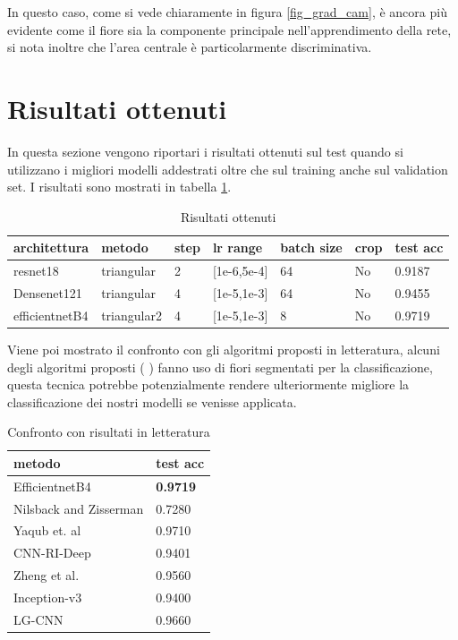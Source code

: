 In questo caso, come si vede chiaramente in figura \ref{fig_grad_cam}, è ancora più evidente come il fiore sia la componente principale nell'apprendimento della rete, si nota inoltre che l'area centrale è particolarmente discriminativa.

\section{Risultati ottenuti}
In questa sezione vengono riportari i risultati ottenuti sul test quando si utilizzano i migliori modelli addestrati oltre che sul training anche sul validation set. I risultati sono mostrati in tabella \ref{t_res}.
\begin{table}[H]
\centering
\caption{Risultati ottenuti}
\begin{tabular}{|l|l|l|l|l|l|l|}
\hline
architettura   & metodo      & step & lr range        & batch size & crop & test acc \\ \hline
resnet18       & triangular  & 2    & {[}1e-6,5e-4{]} & 64         & No   & 0.9187   \\ \hline
Densenet121    & triangular  & 4    & {[}1e-5,1e-3{]} & 64         & No   & 0.9455   \\ \hline
efficientnetB4 & triangular2 & 4    & {[}1e-5,1e-3{]} & 8          & No   & 0.9719   \\ \hline
\end{tabular}
\label{t_res}
\end{table}

Viene poi mostrato il confronto con gli algoritmi proposti in letteratura, alcuni degli algoritmi proposti (\cite{Nilsback08} \cite{yaqub} \cite{XIE2017118}) fanno uso di fiori segmentati per la classificazione, questa tecnica potrebbe potenzialmente rendere ulteriormente migliore la classificazione dei nostri modelli se venisse applicata.
\begin{table}[H]
\centering
\caption{Confronto con risultati in letteratura}
\begin{tabular}{|l|l|}
\hline
\textbf{metodo}                                           & \textbf{test acc} \\ \hline
EfficientnetB4                                            & \textbf{0.9719}           \\ \hline
Nilsback and Zisserman \cite{Nilsback08} & 0.7280            \\ \hline
Yaqub et. al \cite{yaqub}                & 0.9710            \\ \hline
CNN-RI-Deep \cite{Xie2016TowardsRI}      & 0.9401            \\ \hline
Zheng et al. \cite{zheng2016good}        & 0.9560            \\ \hline
Inception-v3 \cite{7984661}              & 0.9400            \\ \hline
LG-CNN \cite{XIE2017118}                 & 0.9660            \\ \hline
\end{tabular}
\label{t_conf}
\end{table}
